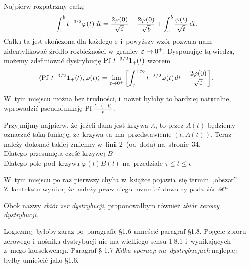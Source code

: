 \documentclass[a4paper,11pt]{article}
\begin{document}
Najpierw rozpatrzmy całkę
\begin{equation}
  \label{eq:Zem-s01-02}
  \int_{ \varepsilon }^{ b } t^{ -3/2 } \varphi( t ) \, dt
  = \frac{ 2 \varphi( 0 ) }{ \sqrt{ \varepsilon } } - \frac{ 2 \varphi( 0 ) }{ \sqrt{ b } }
  + \int_{ \varepsilon }^{ b } \frac{ \psi( t ) }{ \sqrt{ t } } \, dt.
\end{equation}
Całka ta jest skończona dla każdego $\varepsilon$ i~powyższy wzór pozwala
nam zidentyfikować źródło rozbieżności w~granicy $\varepsilon \to 0^{ + }$.
Dysponując tą wiedzą, możemy zdefiniować dystrybucję
$\mathrm{Pf}\, \, t^{ -3/2 } \mathbf{1}_{ + }( t )$ wzorem
\begin{equation}
  \label{eq:Zem-s01-03}
  \langle \mathrm{Pf}\, \, t^{ -3/2 } \mathbf{1}_{ + }( t ), \varphi( t ) \rangle = \lim\limits_{ \varepsilon \to 0^{ + } }
  \left[ \int_{ \varepsilon }^{ +\infty } t^{ -3/2 } \varphi( t ) \, dt
    - \frac{ 2 \varphi( 0 ) }{ \sqrt{ \varepsilon } } \right].
\end{equation}

\vspace{\spaceFour}


\start {} W~tym miejscu można bez trudności, i~nawet byłoby to
bardziej naturalne, wprowadzić pseudofunkcję
$\mathrm{Pf}\, \frac{ \mathbf{1}_{ + }( -t )}{ t }$.

\vspace{\spaceFour}


\start {} Przyjmijmy najpierw, że~jeżeli dana jest krzywa
$A$, to przez $A( t )$ będziemy oznaczać taką funkcję, że~krzywa
ta~ma~przedstawienie $( t, A( t ) )$. Teraz należy dokonać takiej
zmienny w~linii 2~(od~dołu) na~stronie~34. \\
\Jest Dlatego przesunięta cześć krzywej $B$ \\
\Powin Dlatego pole pod~krzywą $\varphi( t ) B( t )$ na~przedziale
$\tau \leq t \leq \epsilon$

\vspace{\spaceFour}


\start {} W~tym miejscu po raz pierwszy chyba w~książce
pojawia~się termin ,,obszar''. Z~kontekstu wynika, że~należy przez
niego rozumieć dowolny podzbiór $\mathcal{R}^{ n }$.

\vspace{\spaceFour}


\start {} Obok nazwy \emph{zbiór zer dystrybucji}, proponowałbym
również \emph{zbiór zerowy dystrybucji}.

\vspace{\spaceFour}


\start {} Logiczniej byłoby zaraz po~paragrafie \S 1.6 umieścić
paragraf \S 1.8. Pojęcie zbioru zerowego i~nośnika dystrybucji nie ma
wielkiego sensu 1.8.1 i~wynikających z~niego konsekwencji. Paragraf \S
1.7 \emph{Kilka operacji na~dystrybucjach} najlepiej byłby umieścić
jako \S 1.6.
\end{document}
